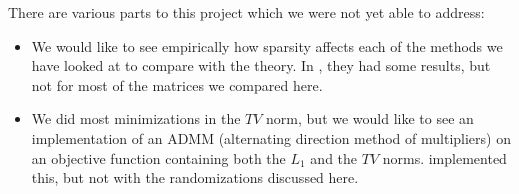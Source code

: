 There are various parts to this project which we were not yet able to address:
\begin{itemize}
	\item We would like to see empirically how sparsity affects each of the methods we 
		have looked at to compare with the theory. In 
		\cite{wotao}, they had some results, but not for most of the matrices we 
		compared here. 
	\item We did most minimizations in the $TV$ norm, but we would like to see an 
		implementation of an ADMM (alternating direction method of multipliers) on an
		objective function containing both the $L_1$ and the $TV$ norms. \cite{wotao}
		implemented this, but not with the randomizations discussed here. 
\end{itemize}
